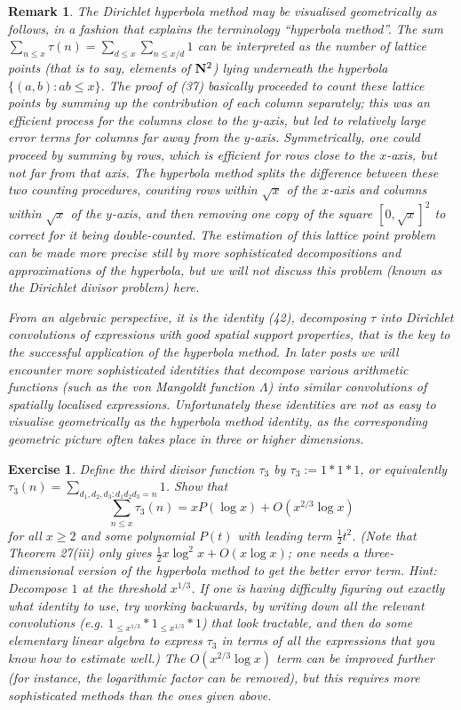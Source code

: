 \documentclass[10pt,reqno]{amsart}
\newtheorem{exercise}[theorem]{Exercise}
\newtheorem{remark}[theorem]{Remark}
\begin{document}
\begin{remark}
    The Dirichlet hyperbola method may be visualised geometrically as follows, in a fashion that explains the terminology “hyperbola method”. The sum $\sum_{n \leq x}\tau(n) = \sum_{d \leq x} \sum_{n \leq x/d} 1$ can be interpreted as the number of lattice points (that is to say, elements of ${\bf N}^2$) lying underneath the hyperbola $\{ (a,b): ab \leq x \}$. The proof of (37) basically proceeded to count these lattice points by summing up the contribution of each column separately; this was an efficient process for the columns close to the $y$-axis, but led to relatively large error terms for columns far away from the $y$-axis. Symmetrically, one could proceed by summing by rows, which is efficient for rows close to the $x$-axis, but not far from that axis. The hyperbola method splits the difference between these two counting procedures, counting rows within $\sqrt{x}$ of the $x$-axis and columns within $\sqrt{x}$ of the $y$-axis, and then removing one copy of the square $[0,\sqrt{x}]^2$ to correct for it being double-counted. The estimation of this lattice point problem can be made more precise still by more sophisticated decompositions and approximations of the hyperbola, but we will not discuss this problem (known as the \emph{Dirichlet divisor problem}) here.

    From an algebraic perspective, it is the identity (42), decomposing $\tau$ into Dirichlet convolutions of expressions with good spatial support properties, that is the key to the successful application of the hyperbola method. In later posts we will encounter more sophisticated identities that decompose various arithmetic functions (such as the von Mangoldt function $\Lambda$) into similar convolutions of spatially localised expressions. Unfortunately these identities are not as easy to visualise geometrically as the hyperbola method identity, as the corresponding geometric picture often takes place in three or higher dimensions.
\end{remark}

\begin{exercise}
    Define the third divisor function $\tau_3$ by $\tau_3 := 1 * 1 * 1$, or equivalently $\tau_3(n) = \sum_{d_1,d_2,d_3: d_1 d_2 d_3 = n} 1$. Show that
    \[  \sum_{n \leq x} \tau_3(n) = xP(\log x) + O( x^{2/3} \log x)\]
    for all $x \geq 2$ and some polynomial $P(t)$ with leading term $\frac{1}{2} t^2$. (Note that Theorem 27(iii) only gives $\frac{1}{2} x\log^2 x + O(x\log x)$; one needs a three-dimensional version of the hyperbola method to get the better error term. Hint: Decompose $1$ at the threshold $x^{1/3}$. If one is having difficulty figuring out exactly what identity to use, try working backwards, by writing down all the relevant convolutions (e.g. $1_{\leq x^{1/3}} * 1_{\leq x^{1/3}} * 1$) that look tractable, and then do some elementary linear algebra to express $\tau_3$ in terms of all the expressions that you know how to estimate well.) The $O(x^{2/3} \log x)$ term can be improved further (for instance, the logarithmic factor can be removed), but this requires more sophisticated methods than the ones given above.
\end{exercise}
\end{document}
